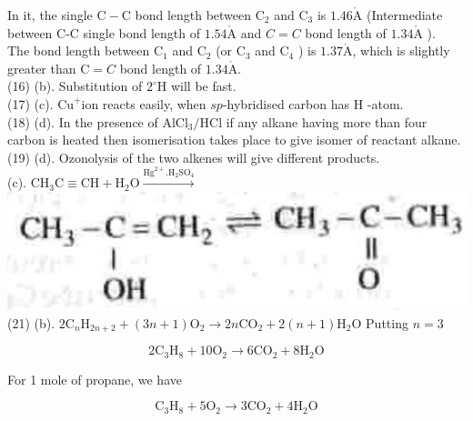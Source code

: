 \documentclass[10pt]{article}
\def\AA{\mathring{\mathrm{A}}}
\begin{document}
In it, the single $\mathrm{C}-\mathrm{C}$ bond length between $\mathrm{C}_{2}$ and $\mathrm{C}_{3}$ is $1.46 \AA$ (Intermediate between C-C single bond length of $1.54 \AA$ and $C=C$ bond length of $1.34 \AA$ ).\\
The bond length between $\mathrm{C}_{1}$ and $\mathrm{C}_{2}$ (or $\mathrm{C}_{3}$ and $\mathrm{C}_{4}$ ) is $1.37 \AA$, which is slightly greater than $\mathrm{C}=C$ bond length of $1.34 \AA$.\\
(16) (b). Substitution of $2^{\circ} \mathrm{H}$ will be fast.\\
(17) (c). $\mathrm{Cu}^{+}$ion reacts easily, when $s p$-hybridised carbon has H -atom.\\
(18) (d). In the presence of $\mathrm{AlCl}_{3} / \mathrm{HCl}$ if any alkane having more than four carbon is heated then isomerisation takes place to give isomer of reactant alkane.\\
(19) (d). Ozonolysis of the two alkenes will give different products.\\
(c). $\mathrm{CH}_{3} \mathrm{C} \equiv \mathrm{CH}+\mathrm{H}_{2} \mathrm{O} \xrightarrow{\mathrm{Hg}^{2+} . \mathrm{H}_{2} \mathrm{SO}_{4}}$\\
\includegraphics[max width=\textwidth, center]{2025_01_28_8470952b98110cec3aabg-241}\\
(21) (b). $2 \mathrm{C}_{n} \mathrm{H}_{2 n+2}+(3 n+1) \mathrm{O}_{2} \rightarrow 2 n \mathrm{CO}_{2}+2(n+1) \mathrm{H}_{2} \mathrm{O}$ Putting $n=3$

$$
2 \mathrm{C}_{3} \mathrm{H}_{8}+10 \mathrm{O}_{2} \longrightarrow 6 \mathrm{CO}_{2}+8 \mathrm{H}_{2} \mathrm{O}
$$

For 1 mole of propane, we have

$$
\mathrm{C}_{3} \mathrm{H}_{8}+5 \mathrm{O}_{2} \longrightarrow 3 \mathrm{CO}_{2}+4 \mathrm{H}_{2} \mathrm{O}
$$
\end{document}
